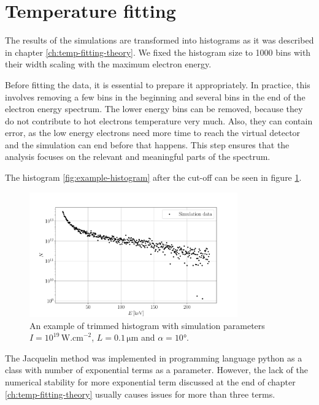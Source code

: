 \section{Temperature fitting}
The results of the simulations are transformed into histograms as it was described in chapter \ref{ch:temp-fitting-theory}. We fixed the histogram size to 1000 bins with their width scaling with the maximum electron energy.

Before fitting the data, it is essential to prepare it appropriately. In practice, this involves removing a few bins in the beginning and several bins in the end of the electron energy spectrum. The lower energy bins can be removed, because they do not contribute to hot electrons temperature very much. Also, they can contain error, as the low energy electrons need more time to reach the virtual detector and the simulation can end before that happens. This step ensures that the analysis focuses on the relevant and meaningful parts of the spectrum.

The histogram \ref{fig:example-histogram} after the cut-off can be seen in figure \ref{fig:trimmed-hist}.

\begin{figure}[h]
	\centering
	\includegraphics[width=0.8\textwidth]{figures/trimmed-hist}
	\caption{An example of trimmed histogram with simulation parameters $I=10^{19}\,\mathrm{W.cm}^{-2}$, $L=0.1\,\mathrm{\mu m}$ and $\alpha = 10$°.}
	\label{fig:trimmed-hist}
\end{figure}

The Jacquelin method was implemented in programming language python as a class with number of exponential terms as a parameter. However, the lack of the numerical stability for more exponential term discussed at the end of chapter \ref{ch:temp-fitting-theory} usually causes issues for more than three terms.
